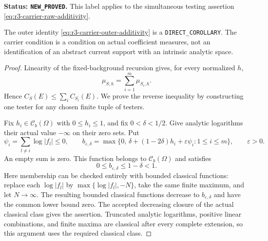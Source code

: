 \documentclass[11pt,a4paper]{article}
\numberwithin{equation}{section}
\theoremstyle{definition}
\theoremstyle{remark}
\begin{document}
\noindent\textbf{Status: \texttt{NEW\_PROVED}.}
This label applies to the simultaneous testing assertion
\eqref{eq:r3-carrier-raw-additivity}.

The outer identity \eqref{eq:r3-carrier-outer-additivity} is a
\texttt{DIRECT\_COROLLARY}.  The carrier condition is a condition
on actual coefficient measures, not an identification of an abstract
current support with an intrinsic analytic space.

\begin{proof}
Linearity of the fixed-background recursion gives, for every
normalized $h$,
\[
 \mu_{S,h}=\sum_{i=1}^m\mu_{S_i,h}.
\]
Hence $C_S(E)\leq\sum_iC_{S_i}(E)$.  We prove the reverse inequality
by constructing one tester for any chosen finite tuple of testers.

Fix $h_i\in\mathcal C_b(\Omega)$ with $0\leq h_i\leq1$, and fix
$0<\delta<1/2$.  Give analytic logarithms their actual value
$-\infty$ on their zero sets.  Put
\[
 \psi_i=\sum_{l\ne i}\log|f_l|\leq0,
 \qquad
 b_{\varepsilon,\delta}
   =\max\bigl\{0,\,
         \delta+(1-2\delta)h_i+\varepsilon\psi_i:
         1\leq i\leq m\bigr\},\qquad\varepsilon>0.
\]
An empty sum is zero.  This function belongs to
$\mathcal C_b(\Omega)$ and satisfies
\begin{equation}
 0\leq b_{\varepsilon,\delta}\leq1-\delta<1.
 \label{eq:r3-carrier-pasted-normalized}
\end{equation}
Here membership can be checked entirely with bounded classical
functions: replace each $\log|f_l|$ by
$\max\{\log|f_l|,-N\}$, take the same finite maximum, and let
$N\to\infty$.  The resulting bounded classical functions decrease
to $b_{\varepsilon,\delta}$ and have the common lower bound zero.
The accepted decreasing closure of the actual classical class gives
the assertion.  Truncated analytic logarithms, positive linear
combinations, and finite maxima are classical after every complete
extension, so this argument uses the required classical class.


\end{proof}
\end{document}

